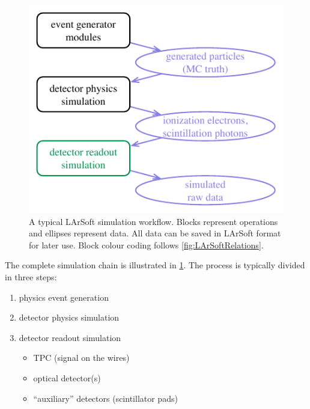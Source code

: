 \begin{figure}
   \centering
   \includegraphics{figures/LArSoftSimulationWorkflow}
   \caption[Typical LArSoft simulation workflow]{\label{fig:LArSoftSimulationWorkflow}
      A typical LArSoft simulation workflow.
      Blocks represent operations and ellipses represent data.
      All data can be saved in LArSoft format for later use.
      Block colour coding follows \cref{fig:LArSoftRelations}.
   }
\end{figure}
The complete simulation chain is illustrated in \cref{fig:LArSoftSimulationWorkflow}.
The process is typically divided in three steps:
\begin{enumerate}
   \item physics event generation
   \item detector physics simulation
   \item detector readout simulation
      \begin{itemize}
         \item TPC (signal on the wires)
         \item optical detector(s)
         \item ``auxiliary'' detectors (\eg scintillator pads)
      \end{itemize}
\end{enumerate}

